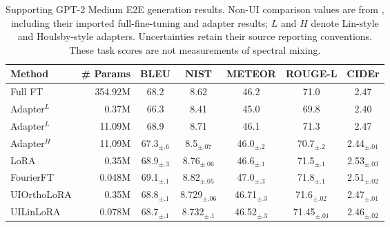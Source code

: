\begin{table}[ht]
\centering
\caption{Supporting GPT-2 Medium E2E generation results. Non-UI comparison values are from \citet{gao2024parameter}, including their imported full-fine-tuning and adapter results; $L$ and $H$ denote Lin-style and Houlsby-style adapters. Uncertainties retain their source reporting conventions. These task scores are not measurements of spectral mixing.}
\label{tab:gpt2_generation_appendix}
\begin{adjustbox}{max width=\linewidth}
\begin{tabular}{@{}l r c c c c c@{}}
\toprule
\textbf{Method} & \textbf{\# Params} & \textbf{BLEU} & \textbf{NIST} & \textbf{METEOR} & \textbf{ROUGE-L} & \textbf{CIDEr} \\
\midrule
Full FT          & 354.92M & 68.2           & 8.62           & 46.2           & 71.0           & 2.47 \\
Adapter$^L$      & 0.37M   & 66.3           & 8.41           & 45.0           & 69.8           & 2.40 \\
Adapter$^L$      & 11.09M  & 68.9           & 8.71           & 46.1           & 71.3           & 2.47 \\
Adapter$^H$      & 11.09M  & 67.3$_{\pm.6}$ & 8.5$_{\pm.07}$ & 46.0$_{\pm.2}$ & 70.7$_{\pm.2}$ & 2.44$_{\pm.01}$ \\
LoRA             & 0.35M   & 68.9$_{\pm.3}$  & 8.76$_{\pm.06}$ & 46.6$_{\pm.1}$ & 71.5$_{\pm.1}$ & 2.53$_{\pm.03}$ \\
FourierFT     & 0.048M  & 69.1$_{\pm.1}$ & 8.82$_{\pm.05}$ & 47.0$_{\pm.3}$ & 71.8$_{\pm.1}$ & 2.51$_{\pm.02}$ \\
UIOrthoLoRA   & 0.35M   & 68.8$_{\pm.1}$ & 8.729$_{\pm.06}$ & 46.71$_{\pm.3}$ & 71.6$_{\pm.02}$ & 2.47$_{\pm.01}$ \\
UILinLoRA     & 0.078M  & 68.7$_{\pm.1}$ & 8.732$_{\pm.1}$ & 46.52$_{\pm.3}$ & 71.45$_{\pm.01}$ & 2.46$_{\pm.02}$ \\
\bottomrule
\end{tabular}
\end{adjustbox}
\end{table}
